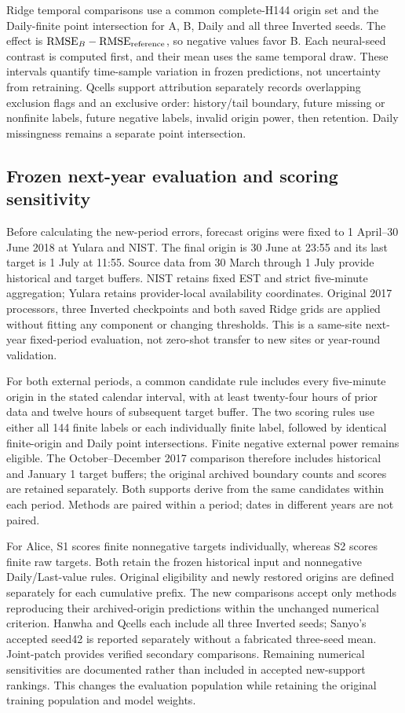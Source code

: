 \documentclass[aip,reprint,floatfix,amsmath,amssymb]{revtex4-2}
\begin{document}
Ridge temporal comparisons use a common complete-H144 origin set and the Daily-finite point intersection for A, B, Daily and all three Inverted seeds. The effect is $\mathrm{RMSE}_B-\mathrm{RMSE}_{\rm reference}$, so negative values favor B. Each neural-seed contrast is computed first, and their mean uses the same temporal draw. These intervals quantify time-sample variation in frozen predictions, not uncertainty from retraining. Qcells support attribution separately records overlapping exclusion flags and an exclusive order: history/tail boundary, future missing or nonfinite labels, future negative labels, invalid origin power, then retention. Daily missingness remains a separate point intersection.


\subsection{Frozen next-year evaluation and scoring sensitivity}
Before calculating the new-period errors, forecast origins were fixed to 1 April--30 June 2018 at Yulara and NIST. The final origin is 30 June at 23:55 and its last target is 1 July at 11:55. Source data from 30 March through 1 July provide historical and target buffers. NIST retains fixed EST and strict five-minute aggregation; Yulara retains provider-local availability coordinates. Original 2017 processors, three Inverted checkpoints and both saved Ridge grids are applied without fitting any component or changing thresholds. This is a same-site next-year fixed-period evaluation, not zero-shot transfer to new sites or year-round validation.

For both external periods, a common candidate rule includes every five-minute origin in the stated calendar interval, with at least twenty-four hours of prior data and twelve hours of subsequent target buffer. The two scoring rules use either all 144 finite labels or each individually finite label, followed by identical finite-origin and Daily point intersections. Finite negative external power remains eligible. The October--December 2017 comparison therefore includes historical and January 1 target buffers; the original archived boundary counts and scores are retained separately. Both supports derive from the same candidates within each period. Methods are paired within a period; dates in different years are not paired.

For Alice, S1 scores finite nonnegative targets individually, whereas S2 scores finite raw targets. Both retain the frozen historical input and nonnegative Daily/Last-value rules. Original eligibility and newly restored origins are defined separately for each cumulative prefix. The new comparisons accept only methods reproducing their archived-origin predictions within the unchanged numerical criterion. Hanwha and Qcells each include all three Inverted seeds; Sanyo's accepted seed42 is reported separately without a fabricated three-seed mean. Joint-patch provides verified secondary comparisons. Remaining numerical sensitivities are documented rather than included in accepted new-support rankings. This changes the evaluation population while retaining the original training population and model weights.
\end{document}
